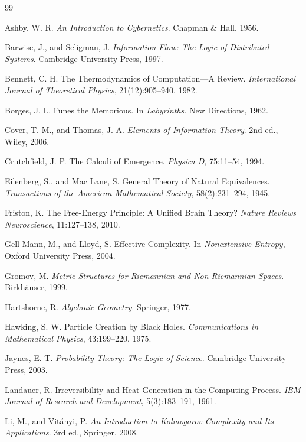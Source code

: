 \documentclass[12pt,oneside]{book}
\theoremstyle{plain} \newtheorem{theorem}{Theorem}[chapter] \newtheorem{lemma}[theorem]{Lemma} \newtheorem{proposition}[theorem]{Proposition} \newtheorem{corollary}[theorem]{Corollary}
\theoremstyle{definition} \newtheorem{definition}[theorem]{Definition} \newtheorem{axiom}[theorem]{Axiom} \newtheorem{construction}[theorem]{Construction}
\theoremstyle{remark} \newtheorem{remark}[theorem]{Remark} \newtheorem{example}[theorem]{Example}
\begin{document}
\begin{thebibliography}{99}

Ashby, W. R.
\textit{An Introduction to Cybernetics}.
Chapman \& Hall, 1956.

Barwise, J., and Seligman, J.
\textit{Information Flow: The Logic of Distributed Systems}.
Cambridge University Press, 1997.

Bennett, C. H.
The Thermodynamics of Computation—A Review.
\textit{International Journal of Theoretical Physics},
21(12):905--940, 1982.

Borges, J. L.
Funes the Memorious.
In \textit{Labyrinths}.
New Directions, 1962.

Cover, T. M., and Thomas, J. A.
\textit{Elements of Information Theory}.
2nd ed.,
Wiley, 2006.

Crutchfield, J. P.
The Calculi of Emergence.
\textit{Physica D},
75:11--54, 1994.

Eilenberg, S., and Mac Lane, S.
General Theory of Natural Equivalences.
\textit{Transactions of the American Mathematical Society},
58(2):231--294, 1945.

Friston, K.
The Free-Energy Principle:
A Unified Brain Theory?
\textit{Nature Reviews Neuroscience},
11:127--138, 2010.

Gell-Mann, M., and Lloyd, S.
Effective Complexity.
In \textit{Nonextensive Entropy},
Oxford University Press, 2004.

Gromov, M.
\textit{Metric Structures for Riemannian and Non-Riemannian Spaces}.
Birkhäuser, 1999.

Hartshorne, R.
\textit{Algebraic Geometry}.
Springer, 1977.

Hawking, S. W.
Particle Creation by Black Holes.
\textit{Communications in Mathematical Physics},
43:199--220, 1975.

Jaynes, E. T.
\textit{Probability Theory: The Logic of Science}.
Cambridge University Press, 2003.

Landauer, R.
Irreversibility and Heat Generation in the Computing Process.
\textit{IBM Journal of Research and Development},
5(3):183--191, 1961.

Li, M., and Vitányi, P.
\textit{An Introduction to Kolmogorov Complexity and Its Applications}.
3rd ed.,
Springer, 2008.


\end{thebibliography}
\end{document}
